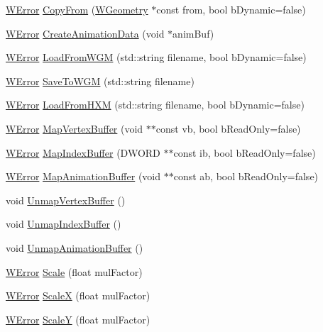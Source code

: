 \begin{DoxyCompactItemize}
\item 
\hyperlink{class_w_error}{W\+Error} \hyperlink{class_w_geometry_afa735adb0739f6d54f467957168cfe38}{Copy\+From} (\hyperlink{class_w_geometry}{W\+Geometry} $\ast$const from, bool b\+Dynamic=false)
\item 
\hyperlink{class_w_error}{W\+Error} \hyperlink{class_w_geometry_a38749309af4f87d44d120bd978a12d90}{Create\+Animation\+Data} (void $\ast$anim\+Buf)
\item 
\hyperlink{class_w_error}{W\+Error} \hyperlink{class_w_geometry_afdffc9bd3c60a54d0d7875d7bf794ec2}{Load\+From\+W\+GM} (std\+::string filename, bool b\+Dynamic=false)
\item 
\hyperlink{class_w_error}{W\+Error} \hyperlink{class_w_geometry_a3e8135b72f0dc4b5f88204a070032c37}{Save\+To\+W\+GM} (std\+::string filename)
\item 
\hyperlink{class_w_error}{W\+Error} \hyperlink{class_w_geometry_a973bc874b7c22956f6dde88526e424bd}{Load\+From\+H\+XM} (std\+::string filename, bool b\+Dynamic=false)
\item 
\hyperlink{class_w_error}{W\+Error} \hyperlink{class_w_geometry_aa6618d489cf8fb3bbd8339ca16a620f1}{Map\+Vertex\+Buffer} (void $\ast$$\ast$const vb, bool b\+Read\+Only=false)
\item 
\hyperlink{class_w_error}{W\+Error} \hyperlink{class_w_geometry_a257228fd6ef4ca9c3ef7e86367be373d}{Map\+Index\+Buffer} (D\+W\+O\+RD $\ast$$\ast$const ib, bool b\+Read\+Only=false)
\item 
\hyperlink{class_w_error}{W\+Error} \hyperlink{class_w_geometry_ada2184692d09980547e6161226ccd51a}{Map\+Animation\+Buffer} (void $\ast$$\ast$const ab, bool b\+Read\+Only=false)
\item 
void \hyperlink{class_w_geometry_a39cf160839dcc25a35abc37bff873e8d}{Unmap\+Vertex\+Buffer} ()
\item 
void \hyperlink{class_w_geometry_ab543762e369709e5779694544f088286}{Unmap\+Index\+Buffer} ()
\item 
void \hyperlink{class_w_geometry_a33d5aa6e31d8d94baf37924c6dec51c9}{Unmap\+Animation\+Buffer} ()
\item 
\hyperlink{class_w_error}{W\+Error} \hyperlink{class_w_geometry_a83dd8a5914b6d5f8a204569885e3de63}{Scale} (float mul\+Factor)
\item 
\hyperlink{class_w_error}{W\+Error} \hyperlink{class_w_geometry_a4a7b0d5cbf2b708c9088b09286243871}{ScaleX} (float mul\+Factor)
\item 
\hyperlink{class_w_error}{W\+Error} \hyperlink{class_w_geometry_a4f55df8af86e43abd9e1a636d738ab9f}{ScaleY} (float mul\+Factor)
$$
\end{DoxyCompactItemize}
